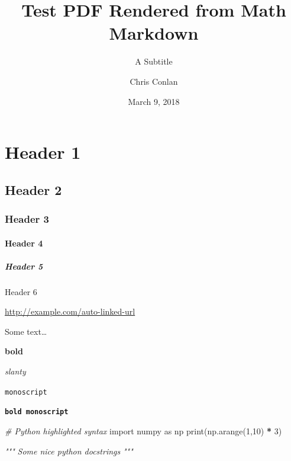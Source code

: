 \documentclass[
                ]
{article}
\title{Test PDF Rendered from Math Markdown}
\subtitle{A Subtitle}
\author{
                    Chris Conlan    }
\date{March 9, 2018}
\newenvironment{Shaded}{\begin{snugshade}}{\end{snugshade}}
\newcommand{\BuiltInTok}[1]{#1}
\newcommand{\CommentTok}[1]{\textcolor[rgb]{0.56,0.35,0.01}{\textit{#1}}}
\newcommand{\DecValTok}[1]{\textcolor[rgb]{0.00,0.00,0.81}{#1}}
\newcommand{\ImportTok}[1]{#1}
\newcommand{\NormalTok}[1]{#1}
\newcommand{\OperatorTok}[1]{\textcolor[rgb]{0.81,0.36,0.00}{\textbf{#1}}}
\begin{document}
\maketitle







\hypertarget{header-1}{%
\section{Header 1}\label{header-1}}

\hypertarget{header-2}{%
\subsection{Header 2}\label{header-2}}

\hypertarget{header-3}{%
\subsubsection{Header 3}\label{header-3}}

\hypertarget{header-4}{%
\paragraph{Header 4}\label{header-4}}

\hypertarget{header-5}{%
\subparagraph{Header 5}\label{header-5}}

Header 6

\url{http://example.com/auto-linked-url}

Some text\ldots{}

\textbf{bold}

\emph{slanty}

\texttt{monoscript}

\textbf{\texttt{bold\ monoscript}}

\begin{Shaded}
\begin{Highlighting}[]
\CommentTok{# Python highlighted syntax}
\ImportTok{import}\NormalTok{ numpy }\ImportTok{as}\NormalTok{ np}
\BuiltInTok{print}\NormalTok{(np.arange(}\DecValTok{1}\NormalTok{,}\DecValTok{10}\NormalTok{) }\OperatorTok{*} \DecValTok{3}\NormalTok{)}

\CommentTok{"""}
\CommentTok{Some nice python docstrings}
\CommentTok{"""}
\end{Highlighting}
\end{Shaded}
\end{document}
